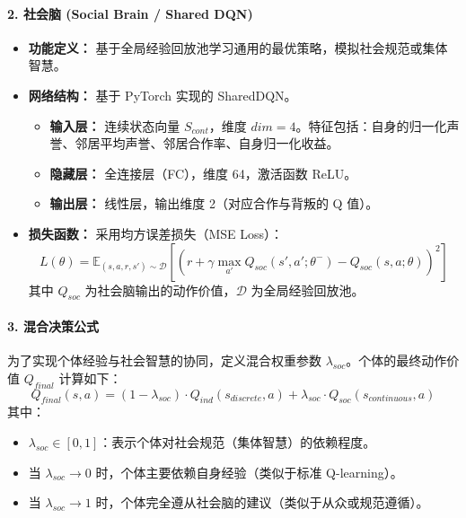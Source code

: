 \documentclass[UTF8,a4paper,12pt]{ctexart}
\begin{document}
\paragraph{2. 社会脑 (Social Brain / Shared DQN)}
\begin{itemize}
    \item \textbf{功能定义：} 基于全局经验回放池学习通用的最优策略，模拟社会规范或集体智慧。
    \item \textbf{网络结构：} 基于 PyTorch 实现的 SharedDQN。
    \begin{itemize}
        \item \textbf{输入层：} 连续状态向量 $S_{cont}$，维度 $dim=4$。特征包括：自身的归一化声誉、邻居平均声誉、邻居合作率、自身归一化收益。
        \item \textbf{隐藏层：} 全连接层（FC），维度 64，激活函数 ReLU。
        \item \textbf{输出层：} 线性层，输出维度 2（对应合作与背叛的 Q 值）。
    \end{itemize}
    \item \textbf{损失函数：} 采用均方误差损失（MSE Loss）：
    \begin{equation}
    L(\theta) = \mathbb{E}_{(s,a,r,s') \sim \mathcal{D}} \left[ \left( r + \gamma \max_{a'} Q_{soc}(s', a'; \theta^-) - Q_{soc}(s, a; \theta) \right)^2 \right]
    \end{equation}
    其中 $Q_{soc}$ 为社会脑输出的动作价值，$\mathcal{D}$ 为全局经验回放池。
\end{itemize}

\paragraph{3. 混合决策公式}
为了实现个体经验与社会智慧的协同，定义混合权重参数 $\lambda_{soc}$。个体的最终动作价值 $Q_{final}$ 计算如下：
\begin{equation}
Q_{final}(s, a) = (1 - \lambda_{soc}) \cdot Q_{ind}(s_{discrete}, a) + \lambda_{soc} \cdot Q_{soc}(s_{continuous}, a)
\end{equation}
其中：
\begin{itemize}
    \item $\lambda_{soc} \in [0, 1]$：表示个体对社会规范（集体智慧）的依赖程度。
    \item 当 $\lambda_{soc} \to 0$ 时，个体主要依赖自身经验（类似于标准 Q-learning）。
    \item 当 $\lambda_{soc} \to 1$ 时，个体完全遵从社会脑的建议（类似于从众或规范遵循）。
\end{itemize}
\end{document}
